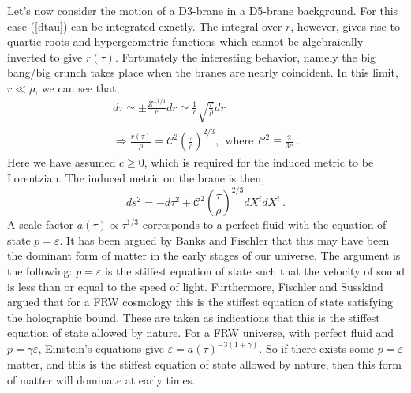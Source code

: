 \documentclass[a4paper,12pt]{article}
\newcommand{\ed}{\varepsilon}
\begin{document}
Let's now consider the motion of a D3-brane in a D5-brane background.   
For this case (\ref{dtau}) can be integrated exactly.  The integral
over $r$, however, gives rise to quartic roots and hypergeometric
functions which cannot be algebraically inverted to give $r(\tau)$.
Fortunately the interesting behavior, namely the big bang/big crunch
takes place when the branes are nearly
coincident.  In this limit, $r \ll \rho$, we can see that,
\begin{eqnarray*}
d \tau \simeq \pm \frac{Z^{-1/4}}{c} dr \simeq
\frac{1}{c}\sqrt{\frac{r}{\rho}} dr\\
\Longrightarrow \frac{r(\tau)}{\rho} = \mathcal{C}^2
(\frac{\tau}{\rho})^{2/3}, \ \ \mbox{where}
\ \ \mathcal{C}^2 \equiv \frac{2}{3 c} \ .
\end{eqnarray*}
Here we have assumed $c \ge 0$, which is required for the induced metric
to be Lorentzian.
The induced metric on the brane is then,
$$
ds^2 = - d\tau^2 + \mathcal{C}^2 (\frac{\tau}{\rho})^{2/3} dX^i dX^i \ .
$$
A scale factor $a(\tau) \propto \tau^{1/3}$ corresponds to a perfect
fluid with the equation
of state $p = \ed$.  It has been argued by Banks and
Fischler\cite{bankfish} that this may have been the dominant form of
matter in the early stages of our universe.  The argument is the
following:  $p = \ed$ is the
stiffest equation of state such that the velocity of sound is less
than or equal to the speed of light.  
Furthermore, Fischler and Susskind argued that for a FRW cosmology this
is the stiffest equation of state satisfying the holographic 
bound\cite{fs}.  These are taken as indications that 
this is the stiffest equation of state allowed by
nature.  For a FRW universe, with perfect fluid and 
$p = \gamma \ed$, 
Einstein's equations give $\ed = a( \tau )^{-3(1+\gamma)}$.  So if
there exists some $p = \ed$ matter, and this is the stiffest
equation of state allowed by nature, then this form of matter will dominate 
at early times.
\end{document}
